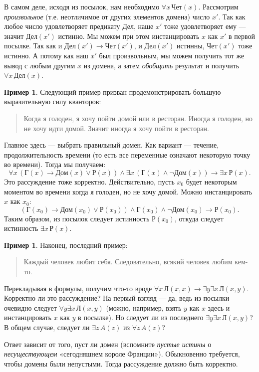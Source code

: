 \documentclass[12pt,notitlepage]{article}
\theoremstyle{plain}
\theoremstyle{definition}
\newtheorem{exm}[thm]{Пример}
\theoremstyle{plain}
\newcommand{\1}{\mathbf{1}}
\newcommand{\0}{\mathbf{0}}
\begin{document}
В самом деле, исходя из посылок, нам необходимо $\forall x\, \text{Чет}(x)$. Рассмотрим \emph{произвольное} (т.е. неотличимое от других элементов домена) число $x'$. Так как любое число удовлетворяет предикату $\text{Дел}$, наше $x'$ тоже удовлетворяет ему --- значит $\text{Дел}(x')$ истинно. Мы можем при этом инстанцировать $x$ как $x'$ в первой посылке. Так как и $\text{Дел}(x') \to \text{Чет}(x')$, и $\text{Дел}(x')$ истинны, $\text{Чет}(x')$ тоже истинно. А потому как наш $x'$ был произвольным, мы можем получить тот же вывод с любым другим $x$ из домена, а затем \emph{обобщить} результат и получить $\forall x\, \text{Дел}(x)$.
\begin{exm}
	
	Следующий пример призван продемонстрировать большую выразительную силу кванторов:
	\begin{quote}
		Когда я голоден, я хочу пойти домой или в ресторан. Иногда я голоден, но не хочу идти домой. Значит иногда я хочу пойти в ресторан. 
	\end{quote}
	Главное здесь --- выбрать правильный домен. Как вариант --- течение, продолжительность времени (то есть все переменные означают некоторую точку во времени). Тогда мы получаем: $$\forall x\, (\text{Г}(x) \to \text{Дом}(x) \vee \text{Р}(x)) \wedge \exists x\, (\text{Г}(x) \wedge \neg \text{Дом}(x)) \to \exists x\, \text{Р}(x).$$ Это рассуждение тоже корректно. Действительно, пусть $x_0$ будет некоторым моментом во времени когда я голоден, но не хочу домой. Можно инстанцировать $x$ как $x_0$:
	$$(\text{Г}(x_0) \to \text{Дом}(x_0) \vee \text{Р}(x_0)) \wedge \text{Г}(x_0) \wedge \neg \text{Дом}(x_0) \to \text{Р}(x_0).$$
	Таким образом, из посылок следует истинность $\text{Р}(x_0)$, откуда следует истинность $\exists x\, \text{Р}(x)$.
\end{exm}

\begin{exm}
	Наконец, последний пример:
	\begin{quote}
		Каждый человек любит себя. Следовательно, всякий человек любим кем-то.
	\end{quote}
	Перекладывая в формулы, получим что-то вроде $\forall x\, \text{Л}(x,x) \to \exists y \exists x\, \text{Л}(x,y)$. Корректно ли это рассуждение? На первый взгляд --- да, ведь из посылки очевидно следует $\forall y \exists x\, \text{Л}(x,y)$ (можно, например, взять $y$ как $x$ здесь и инстанцировать $x$ как $y$ в посылке). Но следует ли из последнего $\exists y \exists x\, \text{Л}(x,y)$? В общем случае, следует ли $\exists z\, A(z)$ из $\forall z\, A(z)$?
	
	Ответ зависит от того, пуст ли домен (вспомните \emph{пустые истины} о \emph{несуществующем} «сегодняшнем короле Франции»). Обыкновенно требуется, чтобы домены были непустыми. Тогда рассуждение должно быть корректно.
\end{exm}
\end{document}

